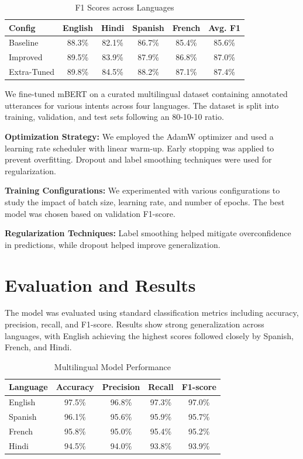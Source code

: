 \documentclass{ecai}
\begin{document}
\begin{table}[H]
\centering
\caption{F1 Scores across Languages}
\begin{tabular}{lcccc|c}
\toprule
Config        & English & Hindi & Spanish & French & Avg. F1 \\
\midrule
Baseline      & 88.3\%  & 82.1\% & 86.7\%  & 85.4\% & 85.6\%  \\
Improved      & 89.5\%  & 83.9\% & 87.9\%  & 86.8\% & 87.0\%  \\
Extra-Tuned   & 89.8\%  & 84.5\% & 88.2\%  & 87.1\% & 87.4\%  \\
\bottomrule
\end{tabular}
\end{table}

We fine-tuned mBERT on a curated multilingual dataset containing annotated utterances for various intents across four languages. The dataset is split into training, validation, and test sets following an 80-10-10 ratio.

\textbf{Optimization Strategy:} We employed the AdamW optimizer and used a learning rate scheduler with linear warm-up. Early stopping was applied to prevent overfitting. Dropout and label smoothing techniques were used for regularization.

\textbf{Training Configurations:} We experimented with various configurations to study the impact of batch size, learning rate, and number of epochs. The best model was chosen based on validation F1-score.

\textbf{Regularization Techniques:} Label smoothing helped mitigate overconfidence in predictions, while dropout helped improve generalization.

\section{Evaluation and Results}
The model was evaluated using standard classification metrics including accuracy, precision, recall, and F1-score. Results show strong generalization across languages, with English achieving the highest scores followed closely by Spanish, French, and Hindi.

\begin{table}[H]
\centering
\caption{Multilingual Model Performance}
\begin{tabular}{lcccc}
\toprule
Language & Accuracy & Precision & Recall & F1-score \\
\midrule
English  & 97.5\%   & 96.8\%    & 97.3\% & 97.0\% \\
Spanish  & 96.1\%   & 95.6\%    & 95.9\% & 95.7\% \\
French   & 95.8\%   & 95.0\%    & 95.4\% & 95.2\% \\
Hindi    & 94.5\%   & 94.0\%    & 93.8\% & 93.9\% \\
\bottomrule
\end{tabular}
\end{table}
\end{document}
